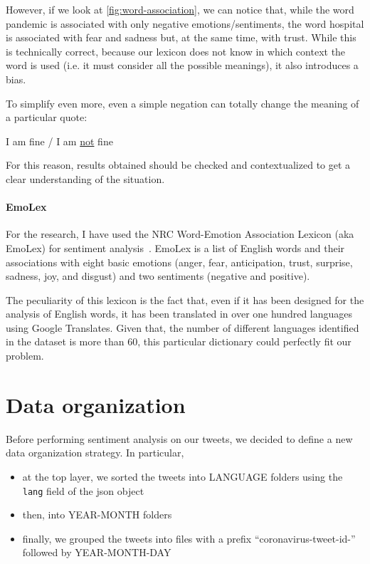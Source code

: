 However, if we look at \autoref{fig:word-association}, we can notice that, while the word pandemic is associated with only negative emotions/sentiments, the word hospital is associated with fear and sadness but, at the same time, with trust. While this is technically correct, because our lexicon does not know in which context the word is used (i.e. it must consider all the possible meanings), it also introduces a bias.

To simplify even more, even a simple negation can totally change the meaning of a particular quote:

\begin{center}
	I am fine / I am \underline{not} fine
\end{center}

For this reason, results obtained should be checked and contextualized to get a clear understanding of the situation. 

\paragraph{EmoLex}

For the research, I have used the NRC Word-Emotion Association Lexicon (aka EmoLex) for sentiment analysis~\cite{ncrwebsite}. EmoLex is a list of English words and their associations with eight basic emotions (anger, fear, anticipation, trust, surprise, sadness, joy, and disgust) and two sentiments (negative and positive).

The peculiarity of this lexicon is the fact that, even if it has been designed for the analysis of English words, it has been translated in over one hundred languages using Google Translates. Given that, the number of different languages identified in the dataset is more than 60, this particular dictionary could perfectly fit our problem.

\section{Data organization}
\label{sub:data-org}

Before performing sentiment analysis on our tweets, we decided to define a new data organization strategy. In particular,

\begin{itemize}
	\item at the top layer, we sorted the tweets into LANGUAGE folders using the \texttt{lang} field of the json object
	\item then, into YEAR-MONTH folders
	\item finally, we grouped the tweets into files with a prefix “coronavirus-tweet-id-” followed by YEAR-MONTH-DAY
\end{itemize}


